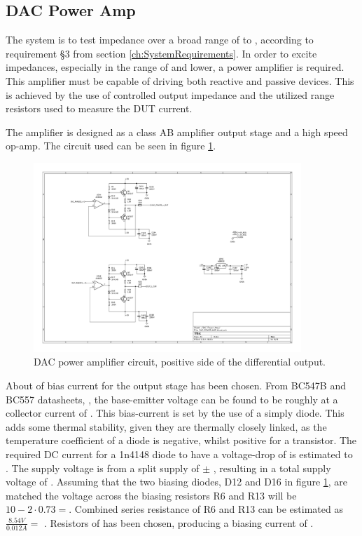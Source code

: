 \subsection{DAC Power Amp} \label{subsec:DAC_Filter}
The system is to test impedance over a broad range of  to , according to requirement §3 from section \ref{ch:SystemRequirements}. In order to excite impedances, especially in the range of  and lower, a power amplifier is required. This amplifier must be capable of driving both reactive and passive devices. This is achieved by the use of controlled output impedance and the utilized range resistors used to measure the DUT current. 

The amplifier is designed as a class AB amplifier output stage and a high speed op-amp. The circuit used can be seen in figure \ref{fig_7_1_1_5_DAC_POWER_AMP}.

\begin{figure}[H]
    \centering
    \includegraphics[clip, trim=150 320 415 40, width=0.9\textwidth]{Sections/7_SystemDesign/Figures/7_1_1_5_DAC Power Amp.pdf}
    \caption{DAC power amplifier circuit, positive side of the differential output.}
    \label{fig_7_1_1_5_DAC_POWER_AMP}
\end{figure}

About  of bias current for the output stage has been chosen. From BC547B and BC557 datasheets, \cite{BC547_datasheet} \cite{BC557_datasheet}, the base-emitter voltage can be found to be roughly  at a collector current of . This bias-current is set by the use of a simply diode. This adds some thermal stability, given they are thermally closely linked, as the temperature coefficient of a diode is negative, whilst positive for a transistor. The required DC current for a 1n4148 diode to have a voltage-drop of  is estimated to . The supply voltage is from a split supply of $\pm$ , resulting in a total supply voltage of . Assuming that the two biasing diodes, D12 and D16 in figure \ref{fig_7_1_1_5_DAC_POWER_AMP}, are matched the voltage across the biasing resistors R6 and R13 will be $10-2\cdot0.73 = $. Combined series resistance of R6 and R13 can be estimated as $\frac{8.54 V}{0.012 A} = $ . Resistors of  has been chosen, producing a biasing current of .

